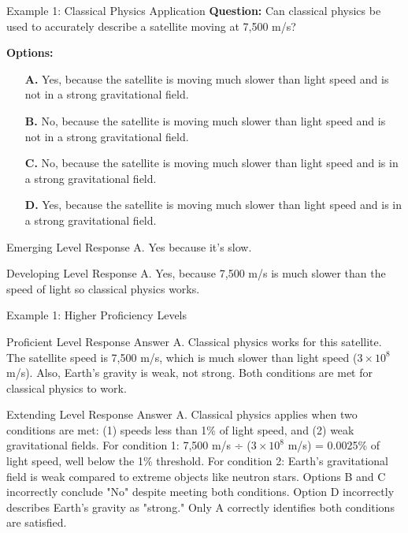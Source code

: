 \documentclass{beamer}
\begin{document}
\begin{frame}{Example 1: Classical Physics Application}
\textbf{Question:} Can classical physics be used to accurately describe a satellite moving at 7,500 m/s?

\textbf{Options:}
\begin{itemize}
\item[\textbf{A.}] Yes, because the satellite is moving much slower than light speed and is not in a strong gravitational field.
\item[\textbf{B.}] No, because the satellite is moving much slower than light speed and is not in a strong gravitational field.
\item[\textbf{C.}] No, because the satellite is moving much slower than light speed and is in a strong gravitational field.
\item[\textbf{D.}] Yes, because the satellite is moving much slower than light speed and is in a strong gravitational field.
\end{itemize}

\pause
\begin{block}{Emerging Level Response}
A. Yes because it's slow.
\end{block}

\pause
\begin{block}{Developing Level Response}  
A. Yes, because 7,500 m/s is much slower than the speed of light so classical physics works.
\end{block}
\end{frame}

\begin{frame}{Example 1: Higher Proficiency Levels}
\begin{block}{Proficient Level Response}
Answer A. Classical physics works for this satellite. The satellite speed is 7,500 m/s, which is much slower than light speed ($3 \times 10^8$ m/s). Also, Earth's gravity is weak, not strong. Both conditions are met for classical physics to work.
\end{block}

\pause
\begin{block}{Extending Level Response}
Answer A. Classical physics applies when two conditions are met: (1) speeds less than 1\% of light speed, and (2) weak gravitational fields. For condition 1: 7,500 m/s ÷ ($3 \times 10^8$ m/s) = 0.0025\% of light speed, well below the 1\% threshold. For condition 2: Earth's gravitational field is weak compared to extreme objects like neutron stars. Options B and C incorrectly conclude "No" despite meeting both conditions. Option D incorrectly describes Earth's gravity as "strong." Only A correctly identifies both conditions are satisfied.
\end{block}
\end{frame}
\end{document}
